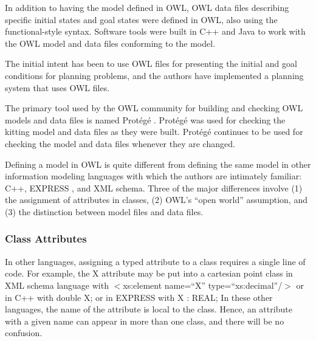 In addition to having the model defined in OWL, OWL data files describing
specific initial states and goal states were defined in OWL, also using the
functional-style syntax.  Software tools were built in C++ and Java to work with the
OWL model and data files conforming to the model.

The initial intent has been to use OWL files for presenting the initial and
goal conditions for planning problems, and the authors have implemented a
planning system that uses OWL files.

The primary tool used by the OWL community for building and checking OWL
models and data files is named Prot\'{e}g\'{e} \cite{Horridge.2011}.  Prot\'{e}g\'{e} was
used for checking the kitting model and data files as they were
built.  Prot\'{e}g\'{e} continues to be used for checking the model and data files
whenever they are changed.

Defining a model in OWL is quite different from defining the same model in
other information modeling languages with which the authors are intimately
familiar: C++, EXPRESS \cite{EXPRESSmanual}, and XML schema. Three of the
major differences involve (1) the assignment of attributes in classes, (2)
OWL's ``open world'' assumption, and (3) the distinction between model
files and data files.\\

\subsubsection{Class Attributes}
In other languages, assigning a typed attribute to a class requires a
single line of code. For example, the X attribute may be put into a
cartesian point class in XML schema language with
\newline \sf $<$xs:element name=``X'' type=``xs:decimal''/$>$\rm
\newline or in C++ with
\newline \sf double X; \rm
\newline or in EXPRESS with
\newline \sf X : REAL; \rm \newline
In these other languages, the name of the attribute is local to the class.
Hence, an attribute with a given name can appear in more than one class, and
there will be no confusion.


